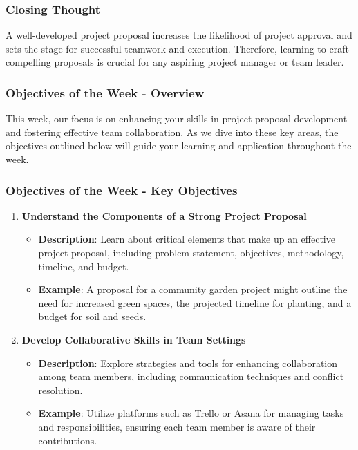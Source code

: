 \documentclass[aspectratio=169]{beamer}
\begin{document}
\begin{frame}[fragile]
    \frametitle{Closing Thought}
    A well-developed project proposal increases the likelihood of project approval and sets the stage for successful teamwork and execution. Therefore, learning to craft compelling proposals is crucial for any aspiring project manager or team leader.
\end{frame}

\begin{frame}[fragile]
    \frametitle{Objectives of the Week - Overview}
    This week, our focus is on enhancing your skills in project proposal development and fostering effective team collaboration. 
    As we dive into these key areas, the objectives outlined below will guide your learning and application throughout the week.
\end{frame}

\begin{frame}[fragile]
    \frametitle{Objectives of the Week - Key Objectives}
    \begin{enumerate}
        \item \textbf{Understand the Components of a Strong Project Proposal}
        \begin{itemize}
            \item \textbf{Description}: Learn about critical elements that make up an effective project proposal, including problem statement, objectives, methodology, timeline, and budget.
            \item \textbf{Example}: A proposal for a community garden project might outline the need for increased green spaces, the projected timeline for planting, and a budget for soil and seeds.
        \end{itemize}

        \item \textbf{Develop Collaborative Skills in Team Settings}
        \begin{itemize}
            \item \textbf{Description}: Explore strategies and tools for enhancing collaboration among team members, including communication techniques and conflict resolution.
            \item \textbf{Example}: Utilize platforms such as Trello or Asana for managing tasks and responsibilities, ensuring each team member is aware of their contributions.
        \end{itemize}
    \end{enumerate}
\end{frame}
\end{document}
